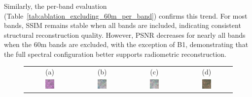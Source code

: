 Similarly, the per-band evaluation (Table~\ref{tab:ablation_excluding_60m_per_band}) confirms this trend. For most bands, SSIM remains stable when all bands are included, indicating consistent structural reconstruction quality. However, PSNR decreases for nearly all bands when the 60m bands are excluded, with the exception of B1, demonstrating that the full spectral configuration better supports radiometric reconstruction.
\begin{figure}[!htbp]
    \centering
    \setlength{\tabcolsep}{2pt} %
    \renewcommand{\arraystretch}{1.0} %

    \begin{tabular}{cccc}
        (a) & (b) & (c) & (d) \\
        \includegraphics[width=0.2\textwidth, height=0.2\textheight, keepaspectratio]{img/exclusion_60_m/bands10/sample_000034_sar_pseudo.png} &
        \includegraphics[width=0.2\textwidth, height=0.2\textheight, keepaspectratio]{img/exclusion_60_m/bands10/sample_000034_pred_rgb.png} &
        \includegraphics[width=0.2\textwidth, height=0.2\textheight, keepaspectratio]{img/exclusion_60_m/bands13/sample_000034_pred_rgb.png} &
        \includegraphics[width=0.2\textwidth, height=0.2\textheight, keepaspectratio]{img/exclusion_60_m/bands10/sample_000034_true_rgb.png} \\


\end{tabular}
\end{figure}

